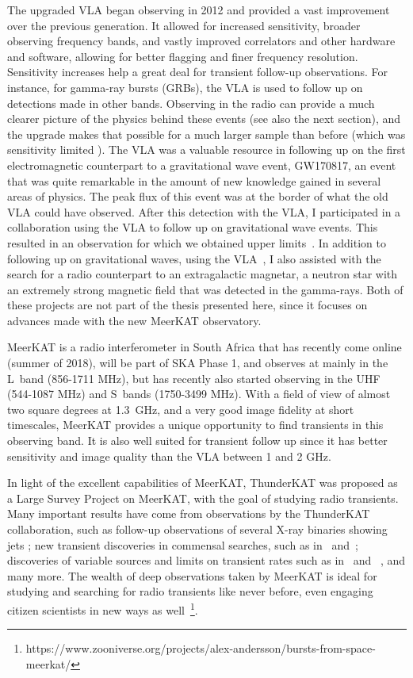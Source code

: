 \documentclass[12pt]{article}
\begin{document}
The upgraded VLA \citep{2011ApJ...739L...1P} began observing in 2012 and provided a vast improvement over the previous generation. It allowed for increased sensitivity, broader observing frequency bands, and vastly improved correlators and other hardware and software, allowing for better flagging and finer frequency resolution. Sensitivity increases help a great deal for transient follow-up observations. For instance, for gamma-ray bursts (GRBs), the VLA is used to follow up on detections made in other bands. Observing in the radio can provide a much clearer picture of the physics behind these events (see also the next section), and the upgrade makes that possible for a much larger sample than before (which was sensitivity limited \cite{Chandra_2012}). The VLA was a valuable resource in following up on the first electromagnetic counterpart to a gravitational wave event, GW170817, an event that was quite remarkable in the amount of new knowledge gained in several areas of physics. The peak flux of this event was at the border of what the old VLA could have observed. After this detection with the VLA, I participated in a collaboration using the VLA to follow up on gravitational wave events. This resulted in an observation for which we obtained upper limits~\citep{2019GCN.26527....1C}. In addition to following up on gravitational waves, using the VLA~\citep{2021Natur.589..207R}, I also assisted with the search for a radio counterpart to an extragalactic magnetar, a neutron star with an extremely strong magnetic field that was detected in the gamma-rays. Both of these projects are not part of the thesis presented here, since it focuses on advances made with the new MeerKAT observatory.

MeerKAT \citep{2016mks..confE...1J} is a radio interferometer in South Africa that has recently come online (summer of 2018), will be part of SKA Phase 1, and observes at mainly in the L~band (856-1711 MHz), but has recently also started observing in the UHF (544-1087 MHz) and S~bands (1750-3499 MHz). With a field of view of almost two square degrees at 1.3~GHz, and a very good image fidelity at short timescales, MeerKAT provides a unique opportunity to find transients in this observing band. It is also well suited for transient follow up since it has better sensitivity and image quality than the VLA between 1 and 2 GHz. 

In light of the excellent capabilities of MeerKAT, ThunderKAT \citep{2016mks..confE..13W} was proposed as a Large Survey Project on MeerKAT, with the goal of studying radio transients. Many important results have come from observations by the ThunderKAT collaboration, such as follow-up observations of several X-ray binaries showing jets \citep[e.g.,][]{2020NatAs...4..697B}; new transient discoveries in commensal searches, such as in~\citet{2020MNRAS.491..560D} and~\citet{2022MNRAS.513.3482A}; discoveries of variable sources and limits on transient rates such as in~\citet{2022MNRAS.517.2894R} and ~\citet{commensal1}, and many more. The wealth of deep observations taken by MeerKAT is ideal for studying and searching for radio transients like never before, even engaging citizen scientists in new ways as well~\footnote{https://www.zooniverse.org/projects/alex-andersson/bursts-from-space-meerkat/}.
\end{document}
